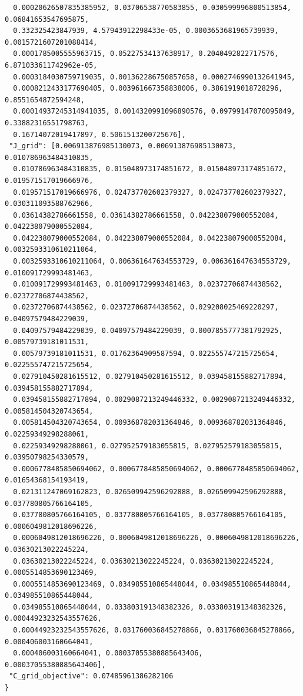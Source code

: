 \documentclass[11pt,reqno]{amsart}
\numberwithin{equation}{section}
\theoremstyle{definition}
\theoremstyle{remark}
\begin{document}
\begin{lstlisting}
  0.00020626507835385952, 0.03706538770583855, 0.030599996800513854, 0.06841653547695875,
  0.332325423847939, 4.57943912298433e-05, 0.0003653681965739939, 0.0015721607201088414,
  0.0001785005555963715, 0.05227534137638917, 0.2040492822717576, 6.871033611742962e-05,
  0.0003184030759719035, 0.001362286750857658, 0.0002746990132641945,
  0.0008212433177690405, 0.003961667358838006, 0.3861919018728296, 0.8551654872594248,
  0.00014937245314941035, 0.0014320991096890576, 0.09799147070095049, 0.33882316551798763,
  0.16714072019417897, 0.5061513200725676],
 "J_grid": [0.006913876985130073, 0.006913876985130073, 0.010786963484310835,
  0.010786963484310835, 0.015048973174851672, 0.015048973174851672, 0.019571517019666976,
  0.019571517019666976, 0.024737702602379327, 0.024737702602379327, 0.030311093588762966,
  0.03614382786661558, 0.03614382786661558, 0.042238079000552084, 0.042238079000552084,
  0.042238079000552084, 0.042238079000552084, 0.042238079000552084, 0.0032593310610211064,
  0.0032593310610211064, 0.006361647634553729, 0.006361647634553729, 0.010091729993481463,
  0.010091729993481463, 0.010091729993481463, 0.02372706874438562, 0.02372706874438562,
  0.02372706874438562, 0.02372706874438562, 0.029208025469220297, 0.04097579484229039,
  0.04097579484229039, 0.04097579484229039, 0.0007855777381792925, 0.00579739181011531,
  0.00579739181011531, 0.01762364909587594, 0.022555747215725654, 0.022555747215725654,
  0.027910450281615512, 0.027910450281615512, 0.039458155882717894, 0.039458155882717894,
  0.039458155882717894, 0.0029087213249446332, 0.0029087213249446332, 0.005814504320743654,
  0.005814504320743654, 0.009368782031364846, 0.009368782031364846, 0.02259349298288061,
  0.02259349298288061, 0.027952579183055815, 0.027952579183055815, 0.03950798254330579,
  0.0006778485850694062, 0.0006778485850694062, 0.0006778485850694062, 0.01654368154193419,
  0.021311247069162823, 0.026509942596292888, 0.026509942596292888, 0.037780805766164105,
  0.037780805766164105, 0.037780805766164105, 0.037780805766164105, 0.0006049812018696226,
  0.0006049812018696226, 0.0006049812018696226, 0.0006049812018696226, 0.03630213022245224,
  0.03630213022245224, 0.03630213022245224, 0.03630213022245224, 0.0005514853690123469,
  0.0005514853690123469, 0.034985510865448044, 0.034985510865448044, 0.034985510865448044,
  0.034985510865448044, 0.033803191348382326, 0.033803191348382326, 0.00044923232543557626,
  0.00044923232543557626, 0.031760036845278866, 0.031760036845278866, 0.000406003160664041,
  0.000406003160664041, 0.00037055380885643406, 0.00037055380885643406],
 "C_grid_objective": 0.07485961386282106
}
\end{lstlisting}
\end{document}
